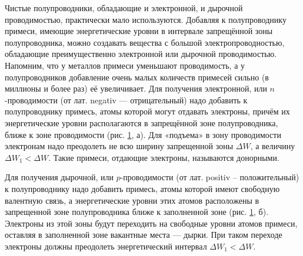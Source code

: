 \documentclass[a4paper,10pt]{book}
\begin{document}
Чистые полупроводники, обладающие и электронной, и дырочной проводимостью, практически мало используются. Добавляя к полупроводнику примеси, имеющие энергетические уровни в интервале запрещённой зоны полупроводника, можно создавать вещества с большой электропроводностью, обладающие преимущественно электронной или дырочной проводимостью. Напомним, что у металлов примеси уменьшают проводимость, а у полупроводников добавление очень малых количеств примесей сильно (в миллионы и более раз) её увеличивает. Для получения электронной, или $n$-проводимости (от лат. negativ — отрицательный) надо добавить к полупроводнику примесь, атомы которой могут отдавать электроны, причём их энергетические уровни располагаются в запрещённой зоне полупроводника, ближе к зоне проводимости (рис. \ref{pic57}, $\textit{а}$). Для «подъема» в зону проводимости электронам надо преодолеть не всю ширину запрещенной зоны $\Delta W$, а величину $\Delta W_1 < \Delta W$. Такие примеси, отдающие электроны, называются донорными.

\begin{figure}[h]
	\caption{}
	\label{pic57}
\end{figure}

Для получения дырочной, или $p$-проводимости (от лат. positiv -- положительный) к полупроводнику надо добавить примесь, атомы которой имеют свободную валентную связь, а энергетические уровни этих атомов расположены в запрещенной зоне полупроводника ближе к заполненной зоне (рис. \ref{pic57}, $\textit{б}$). Электроны из этой зоны будут переходить на свободные уровни атомов примеси, оставляя в заполненной зоне вакантные места — дырки. При таком переходе электроны должны преодолеть энергетический интервал $\Delta W_1 < \Delta W$.
\end{document}
